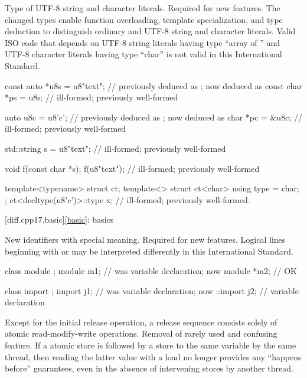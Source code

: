 \change
Type of UTF-8 string and character literals.
\rationale
Required for new features.
The changed types enable function overloading, template specialization, and
type deduction to distinguish ordinary and UTF-8 string and character literals.
\effect
Valid ISO \CppXVII{} code that depends on
UTF-8 string literals having type ``array of '' and
UTF-8 character literals having type ``char''
is not valid in this International Standard.
\begin{codeblock}
const auto *u8s = u8"text";     //  previously deduced as ; now deduced as 
const char *ps = u8s;           // ill-formed; previously well-formed

auto u8c = u8'c';               //  previously deduced as ; now deduced as 
char *pc = &u8c;                // ill-formed; previously well-formed

std::string s = u8"text";       // ill-formed; previously well-formed

void f(const char *s);
f(u8"text");                    // ill-formed; previously well-formed

template<typename> struct ct;
template<> struct ct<char> {
  using type = char;
};
ct<decltype(u8'c')>::type x;    // ill-formed; previously well-formed.
\end{codeblock}

[diff.cpp17.basic]{\ref{basic}: basics}

\change
New identifiers with special meaning.
\rationale
Required for new features.
\effect
Logical lines beginning with
 or  may
be interpreted differently
in this International Standard.
\begin{example}
\begin{codeblock}
class module {};
module m1;          // was variable declaration; now 
module *m2;         // OK

class import {};
import j1;          // was variable declaration; now 
::import j2;        // variable declaration
\end{codeblock}
\end{example}

\change
Except for the initial release operation,
a release sequence consists solely of atomic read-modify-write operations.
\rationale
Removal of rarely used and confusing feature.
\effect
If a  atomic store is followed
by a  store to the same variable by the same thread,
then reading the latter value with a  load
no longer provides any ``happens before'' guarantees,
even in the absence of intervening stores by another thread.

